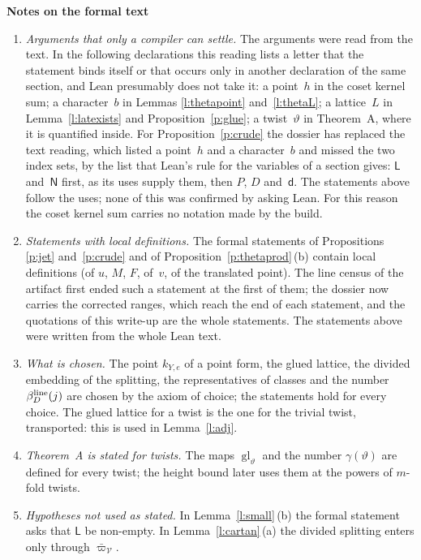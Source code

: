 \documentclass[11pt,a4paper]{article}
\newcommand{\m}[1]{\mbox{$#1$}}        %
\newcommand{\sect}[2]{\refstepcounter{section}\label{#2}\par\addvspace{19pt plus 4pt minus 2pt}\Needspace{7\baselineskip}%
  \noindent\llap{{\fontsize{13.2}{16}\selectfont\bfseries\color{inkfaint}\thesection}\hspace{9pt}}%
  {\fontsize{13.2}{16}\selectfont\bfseries\color{ink}#1}\par\nopagebreak\vspace{-1pt}}
\theoremstyle{plainx}
\theoremstyle{uprightx}
\newcommand{\ix}[1]{\mathsf{#1}}
\begin{document}
\sect{Notes on the formal text}{s:notes}
\begin{enumerate}[label=\textup{\arabic*.},leftmargin=1.6em,itemsep=5pt]
\item \emph{Arguments that only a compiler can settle.} The arguments were read from the text. In the following
declarations this reading lists a letter that the statement binds itself or that occurs only in another
declaration of the same section, and Lean presumably does not take it: a point~$h$ in the coset kernel sum; a
character~$b$ in Lemmas \ref{l:thetapoint} and~\ref{l:thetaL}; a lattice~$L$ in Lemma~\ref{l:latexists} and
Proposition~\ref{p:glue}; a twist~$\vartheta$ in Theorem~A, where it is quantified inside. For
Proposition~\ref{p:crude} the dossier has replaced the text reading, which listed a point~$h$ and a character~$b$
and missed the two index sets, by the list that Lean's rule for the variables of a section gives: \m{\ix L}
and~\m{\ix N} first, as its uses supply them, then $P$, $D$ and~\m{\mathsf{d}}. The statements above follow the uses;
none of this was confirmed by asking Lean. For this reason the coset kernel sum carries no notation made by the
build.
\item \emph{Statements with local definitions.} The formal statements of Propositions \ref{p:jet}
and~\ref{p:crude} and of Proposition~\ref{p:thetaprod}\,(b) contain local definitions (of $u$, $M$, $F$, of~$v$, of the
translated point). The line census of the artifact first ended such a statement at the first of them; the dossier
now carries the corrected ranges, which reach the end of each statement, and the quotations of this write-up are
the whole statements. The statements above were written from the whole Lean text.
\item \emph{What is chosen.} The point \m{k_{Y,e}} of a point form, the glued lattice, the divided embedding of the
splitting, the representatives of classes and the number \m{\lineScale{j}} are chosen by the axiom of choice; the
statements hold for every choice. The glued lattice for a twist is the one for the trivial twist, transported:
this is used in Lemma~\ref{l:adj}.
\item \emph{Theorem~A is stated for twists.} The maps \m{\operatorname{gl}_\vartheta} and the number \m{\gamma(\vartheta)}
are defined for every twist; the height bound later uses them at the powers of $m$-fold twists.
\item \emph{Hypotheses not used as stated.} In Lemma~\ref{l:small}\,(b) the formal statement asks that $\ix L$ be
non-empty. In Lemma~\ref{l:cartan}\,(a) the divided splitting enters only through \m{\bar\varpi_{\mathcal{V}}}.

\end{enumerate}
\end{document}
